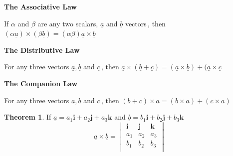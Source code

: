 \documentclass[11pt,a4paper]{article}
\theoremstyle{definition}
\newtheorem{thm}{Theorem}[subsection]
\newcommand{\subhead}[1]{%
  \par\medskip\noindent\textbf{#1}\par\nobreak\smallskip}
\begin{document}
\subhead{The Associative Law}


If $\alpha$ and $\beta$ are any two scalars, $\underline{a}$ and $\underline{b}$ vectors\,, then \hspace{0.2cm}$(\alpha \underline{a}) \times (\beta \underline{b}) = (\alpha \beta ) \underline{a} \times \underline{b}$


\subhead{The Distributive Law}


For any three vectors $\underline{a}, \underline{b}$ and $\underline{c}$\,, then\hspace{0.2cm} $\underline{a}\times (\underline{b} + \underline{c}) = (\underline{a}\times \underline{b}) + (\underline{a}\times \underline{c}$


\subhead{The Companion Law}


For any three vectors $\underline{a}, \underline{b}$ and $\underline{c}$\,, then\hspace{0.2cm}
$(\underline{b} + \underline{c})\times \underline{a} = (\underline{b} \times \underline{a}) + (\underline{c} \times \underline{a})$


\begin{thm}


If $\underline{a} = a_1 \textbf{i} + a_2 \textbf{j} + a_3\textbf{k}$ and  $\underline{b} = b_1 \textbf{i} + b_2 \textbf{j} + b_3\textbf{k}$
$$\underline{a} \times \underline{b} =
\begin{vmatrix}
\textbf{i} & \textbf{j} & \textbf{k}\\
a_1 & a_2 & a_3\\
b_1 & b_2 & b_3\\
\end{vmatrix}$$
\end{thm}
\end{document}
